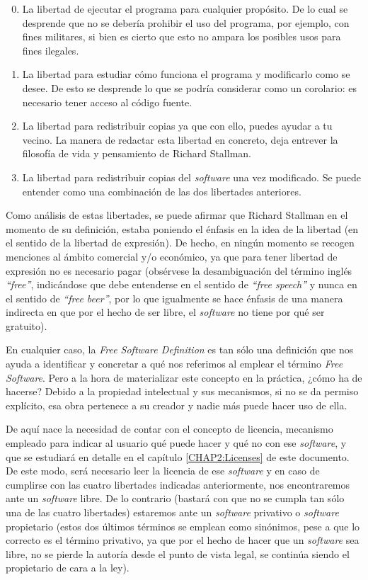 \begin{enumerate}
  \setcounter{enumi}{-1}
  \item La libertad de ejecutar el programa para cualquier propósito. De lo
cual se desprende que no se debería prohibir el uso del programa, por ejemplo,
con fines militares, si bien es cierto que esto no ampara los posibles usos para
fines ilegales.
  \item La libertad para estudiar cómo funciona el programa y modificarlo como
se desee. De esto se desprende lo que se podría considerar como un corolario:
es necesario tener acceso al código fuente.
  \item La libertad para redistribuir copias ya que con ello, puedes ayudar a
tu vecino. La manera de redactar esta libertad en concreto, deja entrever la
filosofía de vida y pensamiento de Richard Stallman.
  \item La libertad para redistribuir copias del \textit{software} una vez
modificado. Se puede entender como una combinación de las dos libertades
anteriores.
\end{enumerate}

Como análisis de estas libertades, se puede afirmar que Richard Stallman en el
momento de su definición, estaba poniendo el énfasis en la idea de la libertad
(en el sentido de la libertad de expresión). De hecho, en ningún momento se
recogen menciones al ámbito comercial y/o económico, ya que para tener libertad
de expresión no es necesario pagar (obsérvese la desambiguación del término
inglés \textit{``free''}, indicándose que debe entenderse en el sentido de
\textit{``free speech''} y nunca en el sentido de \textit{``free beer''}, por lo
que igualmente se hace énfasis de una manera indirecta en que por el hecho de
ser libre, el \textit{software} no tiene por qué ser gratuito).

En cualquier caso, la \textit{Free Software Definition} es tan sólo una
definición que nos ayuda a identificar y concretar a qué nos referimos al
emplear el término \textit{Free Software}. Pero a la hora de materializar este
concepto en la práctica, ¿cómo ha de hacerse? Debido a la propiedad intelectual
y sus mecanismos, si no se da permiso explícito, esa obra pertenece a su creador
y nadie más puede hacer uso de ella.

De aquí nace la necesidad de contar con el concepto de licencia, mecanismo
empleado para indicar al usuario qué puede hacer y qué no con ese
\textit{software}, y que se estudiará en detalle en el capítulo
\ref{CHAP2:Licenses} de este documento. De este modo, será necesario
leer la licencia de ese \textit{software} y en caso de cumplirse con las cuatro
libertades indicadas anteriormente, nos encontraremos ante un \textit{software}
libre. De lo contrario (bastará con que no se cumpla tan sólo una de las cuatro
libertades) estaremos ante un \textit{software} privativo o \textit{software}
propietario (estos dos últimos términos se emplean como sinónimos, pese a que lo
correcto es el término privativo, ya que por el hecho de hacer que un
\textit{software} sea libre, no se pierde la autoría desde el punto de vista
legal, se continúa siendo el propietario de cara a la ley).

